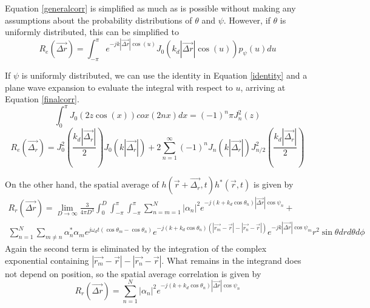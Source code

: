 \documentclass[11pt]{article} %
\begin{document}
Equation \ref{generalcorr} is simplified as much as is possible without making any assumptions about the probability distributions of $\theta$ and $\psi$.  However, if $\theta$ is uniformly distributed, this can be simplified to 
\begin{equation}
R_e(\vec{\Delta r})=\int_{-\pi}^{\pi}e^{-j k |\vec{\Delta r}| \cos(u)} J_0(k_d |\vec{\Delta r}| \cos(u))p_{\psi}(u) du 
\end{equation}

If $\psi$ is uniformly distributed, we can use the identity in Equation \ref{identity} \cite{gradshteyn2007} and a plane wave expansion to evaluate the integral with respect to $u$, arriving at Equation \ref{finalcorr}.
\begin{equation}\label{identity}
\int_0^{\pi} J_0(2z\cos(x))cox(2nx)dx = (-1)^n \pi J_n^2(z)
\end{equation}
\begin{equation}\label{finalcorr}
R_e(\vec{\Delta_r}) = J_0^2(\frac{k_d |\vec{\Delta_r}|}{2})J_0(k|\vec{\Delta_r}|) + 2\sum_{n=1}^{\infty}(-1)^n J_n(k|\vec{\Delta_r}|)J_{n/2}^2(\frac{k_d |\vec{\Delta_r}|}{2})
\end{equation}

On the other hand, the spatial average of $h(\vec{r}+\vec{\Delta_r},t)h^*(\vec{r},t)$ is given by
\begin{multline}
R_r\left(\vec{\Delta r}\right) =  \lim_{D \rightarrow \infty} \frac{3}{4\pi D^3}\int_0^D\int_{-\pi}^\pi \int_{-\pi}^{\pi} \sum_{n=m=1}^N |\alpha_n|^2 e^{-j(k+k_d\cos\theta_n)|\vec{\Delta r}|\cos \psi_n}+\\ \sum_{n=1}^N\sum_{m\neq n} \alpha_n^* \alpha_m e^{j \omega_d t(\cos \theta_m - \cos \theta_n)} e^{-j(k+k_d\cos\theta_n)\left(\left|\vec{r_m} - \vec{r}\right|-\left|\vec{r_n} - \vec{r}\right|\right)}e^{-jk\left|\vec{\Delta r}\right| \cos \psi_m}r^2 \sin\theta dr d\theta d\phi
\end{multline}
Again the second term is eliminated by the integration of the complex exponential containing $\left|\vec{r_m} - \vec{r}\right|-\left|\vec{r_n} - \vec{r}\right|$.  What remains in the integrand does not depend on position, so the spatial average correlation is given by 
\begin{equation}\label{spatialcorr}
R_r\left(\vec{\Delta r}\right) =  \sum_{n=1}^N |\alpha_n|^2 e^{-j(k+k_d\cos\theta_n)|\vec{\Delta r}|\cos \psi_n}
\end{equation}
\end{document}
